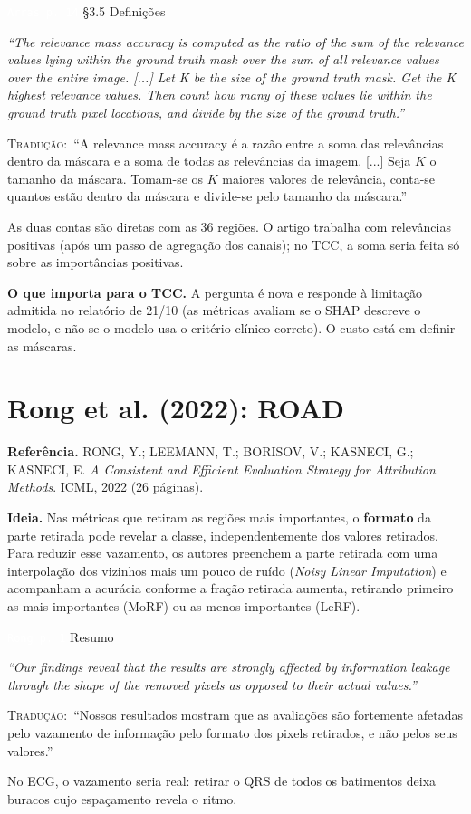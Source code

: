 \documentclass[11pt,a4paper]{article}
\newcommand{\pagechip}[1]{{\setlength{\fboxsep}{1.5pt}\colorbox{cAcc}{\textcolor{white}{\scriptsize\texttt{#1}}}}}
\newenvironment{origquote}{\par\itshape\small}{\par}
\newenvironment{tradquote}{\par\small\textsc{Tradução:}\ }{\par}
\newcommand{\explab}[1]{\par\smallskip{\small\color{cAcc}\textbf{\MakeUppercase{#1}}}\par}
\begin{document}
\begin{citacard}{\pagechip{Arras p. 14} §3.5 Definições}
\begin{origquote}“The relevance mass accuracy is computed as the ratio of the sum of the relevance values lying within the ground truth mask over the sum of all relevance values over the entire image. [...] Let K be the size of the ground truth mask. Get the K highest relevance values. Then count how many of these values lie within the ground truth pixel locations, and divide by the size of the ground truth.”\end{origquote}
\begin{tradquote}“A relevance mass accuracy é a razão entre a soma das relevâncias dentro da máscara e a soma de todas as relevâncias da imagem. [...] Seja $K$ o tamanho da máscara. Tomam-se os $K$ maiores valores de relevância, conta-se quantos estão dentro da máscara e divide-se pelo tamanho da máscara.”\end{tradquote}
\explab{Explicação}
As duas contas são diretas com as 36 regiões. O artigo trabalha com relevâncias positivas (após um passo de agregação dos canais); no TCC, a soma seria feita só sobre as importâncias positivas.
\end{citacard}

\textbf{O que importa para o TCC.} A pergunta é nova e responde à limitação admitida no relatório de 21/10 (as métricas avaliam se o SHAP descreve o modelo, e não se o modelo usa o critério clínico correto). O custo está em definir as máscaras.

\section{Rong et al. (2022): ROAD}
\textbf{Referência.} RONG, Y.; LEEMANN, T.; BORISOV, V.; KASNECI, G.; KASNECI, E. \textit{A Consistent and Efficient Evaluation Strategy for Attribution Methods}. ICML, 2022 (26 páginas).

\textbf{Ideia.} Nas métricas que retiram as regiões mais importantes, o \textbf{formato} da parte retirada pode revelar a classe, independentemente dos valores retirados. Para reduzir esse vazamento, os autores preenchem a parte retirada com uma interpolação dos vizinhos mais um pouco de ruído (\textit{Noisy Linear Imputation}) e acompanham a acurácia conforme a fração retirada aumenta, retirando primeiro as mais importantes (MoRF) ou as menos importantes (LeRF).

\begin{citacard}{\pagechip{Rong p. 1} Resumo}
\begin{origquote}“Our findings reveal that the results are strongly affected by information leakage through the shape of the removed pixels as opposed to their actual values.”\end{origquote}
\begin{tradquote}“Nossos resultados mostram que as avaliações são fortemente afetadas pelo vazamento de informação pelo formato dos pixels retirados, e não pelos seus valores.”\end{tradquote}
\explab{Explicação}
No ECG, o vazamento seria real: retirar o QRS de todos os batimentos deixa buracos cujo espaçamento revela o ritmo.
\end{citacard}
\end{document}
